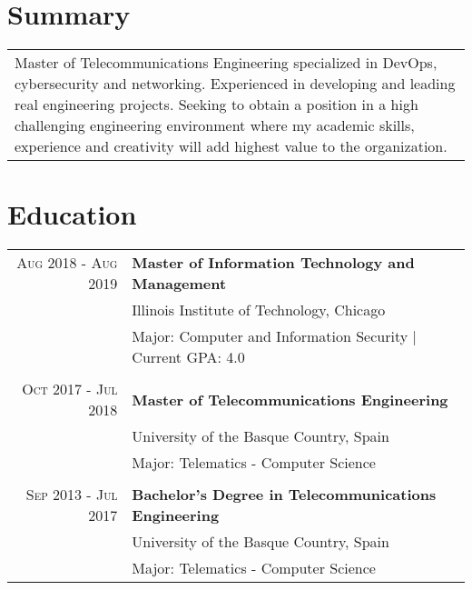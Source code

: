 \documentclass[a4paper,10pt]{article}
\begin{document}
\vspace{.1in}
\section{Summary}
\begin{tabular}{p{15.6cm}}
  Master of Telecommunications Engineering specialized in DevOps, cybersecurity and networking. Experienced in developing and leading real engineering projects. Seeking to obtain a position in a high challenging engineering environment where my academic skills, experience and creativity will add highest value to the organization. 
\end{tabular}

\vspace{.1in}

\section{Education}
\begin{tabular}{rp{13.6cm}}

 \textsc{Aug 2018 - Aug 2019}& \textbf{Master of Information Technology and Management}\\
 & \footnotesize{Illinois Institute of Technology, Chicago} \\
 & Major: Computer and Information Security | Current GPA: 4.0 \\ &\\

 \textsc{Oct 2017 - Jul 2018}& \textbf{Master of Telecommunications Engineering}\\
 & \footnotesize{University of the Basque Country, Spain} \\
 & Major: Telematics - Computer Science \\&\\
 
 \textsc{Sep 2013 - Jul 2017}& \textbf{Bachelor's Degree in Telecommunications Engineering}\\
 & \footnotesize{University of the Basque Country, Spain} \\
 & Major: Telematics - Computer Science 


\end{tabular}
\vspace{-.15in}
\end{document}
